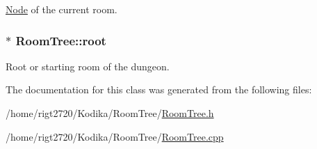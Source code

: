 \hyperlink{classRoomTree_1_1Node}{Node} of the current room. 

\hypertarget{classRoomTree_a3e7726e562748d38e587bb20ccde6451}{
\subsubsection[{root}]{$\ast$ Room\-Tree\-::root\hspace{0.3cm}{\ttfamily [private]}}}\label{classRoomTree_a3e7726e562748d38e587bb20ccde6451}


Root or starting room of the dungeon. 



The documentation for this class was generated from the following files\-:\begin{DoxyCompactItemize}
\item 
/home/rigt2720/\-Kodika/\-Room\-Tree/\hyperlink{RoomTree_8h}{Room\-Tree.\-h}\item 
/home/rigt2720/\-Kodika/\-Room\-Tree/\hyperlink{RoomTree_8cpp}{Room\-Tree.\-cpp}\end{DoxyCompactItemize}
